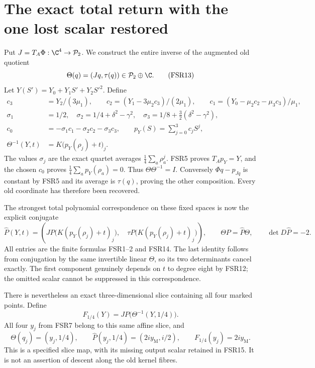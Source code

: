 \section{The exact total return with the one lost scalar restored}
Put $J=T_A\Phi:\C^4\to\mathcal P_2$. We construct the entire
inverse of the augmented old quotient
\[
 \Theta(q)=(Jq,\tau(q))\in\mathcal P_2\oplus\C.
 \tag{FSR13}
\]
Let $Y(S')=Y_0+Y_1S'+Y_2S'^2$. Define
\[
\begin{split}
 c_3&=Y_2/(3\mu_1),\qquad
 c_2=(Y_1-3\mu_2c_3)/(2\mu_1),\qquad
 c_1=(Y_0-\mu_2c_2-\mu_3c_3)/\mu_1,\\
 \sigma_1&=1/2,\quad
 \sigma_2=1/4+\delta^2-\gamma^2,\quad
 \sigma_3=1/8+\tfrac32(\delta^2-\gamma^2),\\
 c_0&=-\sigma_1c_1-\sigma_2c_2-\sigma_3c_3,
 \qquad p_Y(S)=\sum_{j=0}^3c_jS^j,\\
 \Theta^{-1}(Y,t)&=K\bigl(p_Y(\rho_j)+t\bigr)_j.
\end{split}\tag{FSR14}
\]
The values $\sigma_j$ are the exact quartet averages
$\tfrac14\sum_a\rho_a^j$. FSR5 proves $T_Ap_Y=Y$, and the
chosen $c_0$ proves $\tfrac14\sum_ap_Y(\rho_a)=0$.
Thus $\Theta\Theta^{-1}=I$. Conversely $\Phi q-p_{Jq}$ is
constant by FSR5 and its average is $\tau(q)$, proving the other
composition. Every old coordinate has therefore been recovered.

The strongest total polynomial correspondence on these fixed spaces
is now the explicit conjugate
\[
 \widehat P(Y,t)=
 \left(JP\bigl(K(p_Y(\rho_j)+t)_j\bigr),\quad
       \tau P\bigl(K(p_Y(\rho_j)+t)_j\bigr)\right),
 \qquad \Theta P=\widehat P\Theta,
 \qquad\det D\widehat P=-2.
 \tag{FSR15}
\]
All entries are the finite formulas FSR1--2 and FSR14. The last
identity follows from conjugation by the same invertible linear
$\Theta$, so its two determinants cancel exactly. The first
component genuinely depends on $t$ to degree eight by FSR12;
the omitted scalar cannot be suppressed in this correspondence.

There is nevertheless an exact three-dimensional slice containing
all four marked points. Define
\[
 F_{1/4}(Y)=JP\bigl(\Theta^{-1}(Y,1/4)\bigr).
 \tag{FSR16}
\]
All four $y_j$ from FSR7 belong to this same affine slice, and
\[
 \Theta(q_j)=(y_j,1/4),\qquad
 \widehat P(y_j,1/4)=(2iy_{\mathrm M},i/2),\qquad
 F_{1/4}(y_j)=2iy_{\mathrm M}.
 \tag{FSR17}
\]
This is a specified slice map, with its missing output scalar
retained in FSR15. It is not an assertion of descent along the
old kernel fibres.

